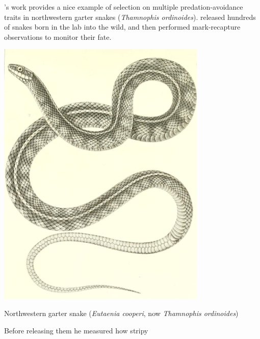 \citet{brodie1992correlational}'s work provides a nice example of
selection on multiple predation-avoidance traits in northwestern garter snakes
({\it Thamnophis ordinoides}). \citeauthor{brodie1992correlational} released hundreds of snakes born in
the lab into the wild, and then performed mark-recapture observations
to monitor their fate.
\begin{marginfigure}
\begin{center} 
\includegraphics[width= 0.75\textwidth]{illustration_images/Quant_gen/Garter_snake/Eutaenia_cooperi.jpg}
\end{center}
\caption{Northwestern garter snake ({\it Eutaenia cooperi}, now {\it
    Thamnophis ordinoides})
 } \label{fig:Garter_snake}
\end{marginfigure}  Before releasing them he measured how stripy
